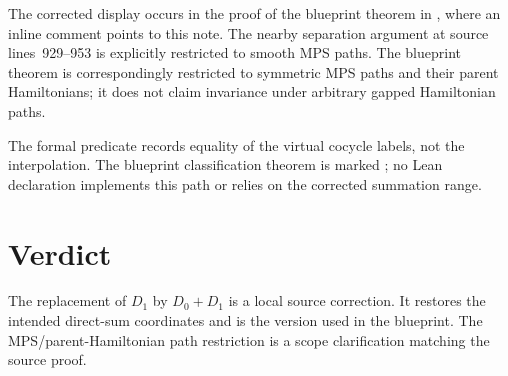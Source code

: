 \documentclass{article}
\begin{document}
The corrected display occurs in the proof of the blueprint theorem
 in
, where an inline
 comment points to this note. The nearby separation argument
at source lines~929--953 is explicitly restricted to smooth MPS paths. The
blueprint theorem is correspondingly restricted to symmetric MPS paths and
their parent Hamiltonians; it does not claim invariance under arbitrary gapped
Hamiltonian paths.

The formal predicate  records equality of the
virtual cocycle labels, not the interpolation. The blueprint classification
theorem is marked ; no Lean declaration implements this path or
relies on the corrected summation range.

\section{Verdict}

The replacement of $D_1$ by $D_0+D_1$ is a local source correction. It restores
the intended direct-sum coordinates and is the version used in the blueprint.
The MPS/parent-Hamiltonian path restriction is a scope clarification matching
the source proof.
\end{document}
